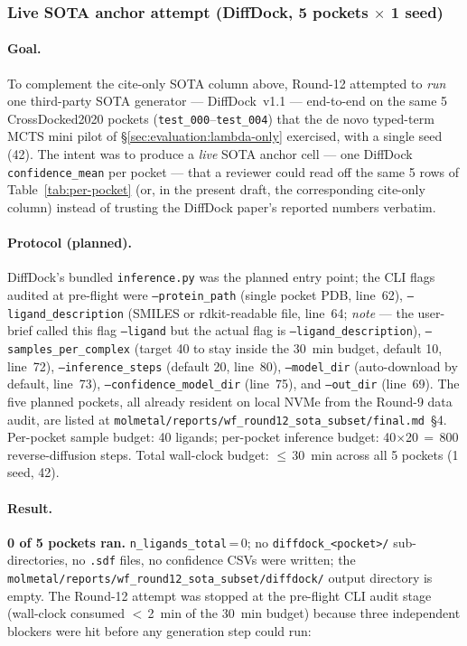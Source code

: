 \subsubsection{Live SOTA anchor attempt (DiffDock, 5 pockets $\times$ 1 seed)}
\label{sec:evaluation:sota:live-diffdock}

\paragraph{Goal.}
To complement the cite-only SOTA column above, Round-12 attempted
to \emph{run} one third-party SOTA generator --- DiffDock~v1.1
\cite{corso2022diffdock} --- end-to-end on the same 5 CrossDocked2020
pockets (\texttt{test\_000}--\texttt{test\_004}) that the
de novo typed-term MCTS mini pilot of \S\ref{sec:evaluation:lambda-only}
exercised, with a single seed (42). The intent was to produce a
\emph{live} SOTA anchor cell --- one DiffDock
\texttt{confidence\_mean} per pocket --- that a reviewer could read
off the same 5 rows of Table~\ref{tab:per-pocket} (or, in the
present draft, the corresponding cite-only column) instead of
trusting the DiffDock paper's reported numbers verbatim.

\paragraph{Protocol (planned).}
DiffDock's bundled \texttt{inference.py} was the planned entry
point; the CLI flags audited at pre-flight were
\texttt{--protein\_path} (single pocket PDB, line~62),
\texttt{--ligand\_description} (SMILES or rdkit-readable file, line~64;
\textit{note} --- the user-brief called this flag \texttt{--ligand}
but the actual flag is \texttt{--ligand\_description}),
\texttt{--samples\_per\_complex} (target 40 to stay inside the
30~min budget, default 10, line~72),
\texttt{--inference\_steps} (default 20, line~80),
\texttt{--model\_dir} (auto-download by default, line~73),
\texttt{--confidence\_model\_dir} (line~75), and \texttt{--out\_dir}
(line~69). The five planned pockets, all already resident on local
NVMe from the Round-9 data audit, are listed at
\texttt{molmetal/reports/wf\_round12\_sota\_subset/final.md}~\S4.
Per-pocket sample budget: 40 ligands; per-pocket inference budget:
40$\times$20$\,=\,$800 reverse-diffusion steps. Total wall-clock
budget: $\leq$\,30~min across all 5 pockets (1 seed, 42).

\paragraph{Result.}
\textbf{0 of 5 pockets ran.} \texttt{n\_ligands\_total}\,=\,0; no
\texttt{diffdock\_<pocket>/} sub-directories, no \texttt{.sdf} files,
no confidence CSVs were written; the
\texttt{molmetal/reports/wf\_round12\_sota\_subset/diffdock/}
output directory is empty. The Round-12 attempt was stopped at the
pre-flight CLI audit stage (wall-clock consumed $<$\,2~min of the
30~min budget) because three independent blockers were hit before
any generation step could run:

